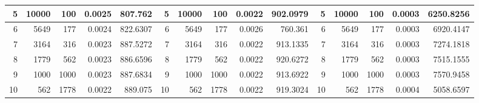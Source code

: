 \begin{table}[htbp]
\begin{tabular}{|r|r|r|r|r|r|r|r|r|r|r|r|r|r|r|}
		\midrule
		5                                 & 10000                           & 100                             & 0.0025                             & 807.762                              & 5                                & 10000                           & 100                             & 0.0022                             & 902.0979                             & 5  & 10000    & 100   & 0.0003 & 6250.8256 \\
		\midrule
		6                                 & 5649                            & 177                             & 0.0024                             & 822.6307                             & 6                                & 5649                            & 177                             & 0.0026                             & 760.361                              & 6  & 5649     & 177   & 0.0003 & 6920.4147 \\
		\midrule
		7                                 & 3164                            & 316                             & 0.0023                             & 887.5272                             & 7                                & 3164                            & 316                             & 0.0022                             & 913.1335                             & 7  & 3164     & 316   & 0.0003 & 7274.1818 \\
		\midrule
		8                                 & 1779                            & 562                             & 0.0023                             & 886.6596                             & 8                                & 1779                            & 562                             & 0.0022                             & 920.6272                             & 8  & 1779     & 562   & 0.0003 & 7515.1555 \\
		\midrule
		9                                 & 1000                            & 1000                            & 0.0023                             & 887.6834                             & 9                                & 1000                            & 1000                            & 0.0022                             & 913.6922                             & 9  & 1000     & 1000  & 0.0003 & 7570.9458 \\
		\midrule
		10                                & 562                             & 1778                            & 0.0022                             & 889.075                              & 10                               & 562                             & 1778                            & 0.0022                             & 919.3024                             & 10 & 562      & 1778  & 0.0004 & 5058.6597 \\

\end{tabular}
\end{table}
